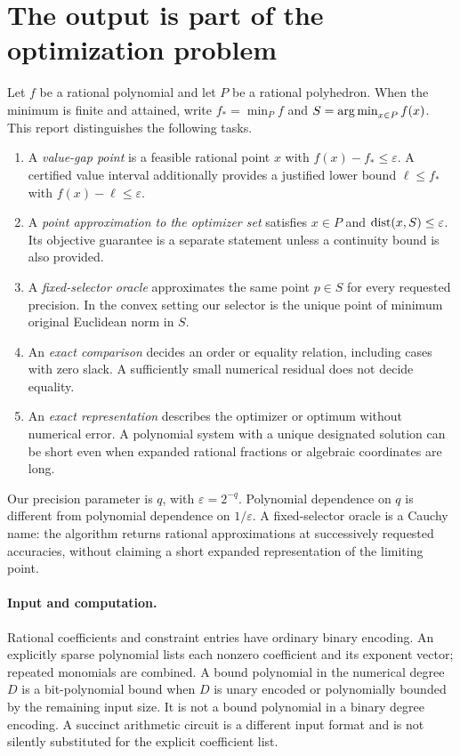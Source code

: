 \section{The output is part of the optimization problem}
\label{sec:contracts}

Let $f$ be a rational polynomial and let $P$ be a rational polyhedron.
When the minimum is finite and attained, write $f_* = \min_P f$ and
$S=\operatorname*{arg\,min}_{x\in P}f(x)$. This report distinguishes the following tasks.
\begin{enumerate}[label=(\roman*)]
\item A \emph{value-gap point} is a feasible rational point $x$ with
$f(x)-f_*\le\varepsilon$. A certified value interval additionally provides
a justified lower bound $\ell\le f_*$ with $f(x)-\ell\le\varepsilon$.
\item A \emph{point approximation to the optimizer set} satisfies
$x\in P$ and $\operatorname{dist}(x,S)\le\varepsilon$. Its objective guarantee is a
separate statement unless a continuity bound is also provided.
\item A \emph{fixed-selector oracle} approximates the same point $p\in S$
for every requested precision. In the convex setting our selector is the
unique point of minimum original Euclidean norm in $S$.
\item An \emph{exact comparison} decides an order or equality relation,
including cases with zero slack. A sufficiently small numerical residual
does not decide equality.
\item An \emph{exact representation} describes the optimizer or optimum
without numerical error. A polynomial system with a unique designated
solution can be short even when expanded rational fractions or algebraic
coordinates are long.
\end{enumerate}

Our precision parameter is $q$, with $\varepsilon=2^{-q}$. Polynomial
dependence on $q$ is different from polynomial dependence on
$1/\varepsilon$. A fixed-selector oracle is a Cauchy name: the algorithm
returns rational approximations at successively requested accuracies,
without claiming a short expanded representation of the limiting point.

\paragraph{Input and computation.}
Rational coefficients and constraint entries have ordinary binary encoding.
An explicitly sparse polynomial lists each nonzero coefficient and its
exponent vector; repeated monomials are combined. A bound polynomial in the
numerical degree $D$ is a bit-polynomial bound when $D$ is unary encoded or
polynomially bounded by the remaining input size. It is not a bound
polynomial in a binary degree encoding. A succinct arithmetic circuit is a
different input format and is not silently substituted for the explicit
coefficient list.

